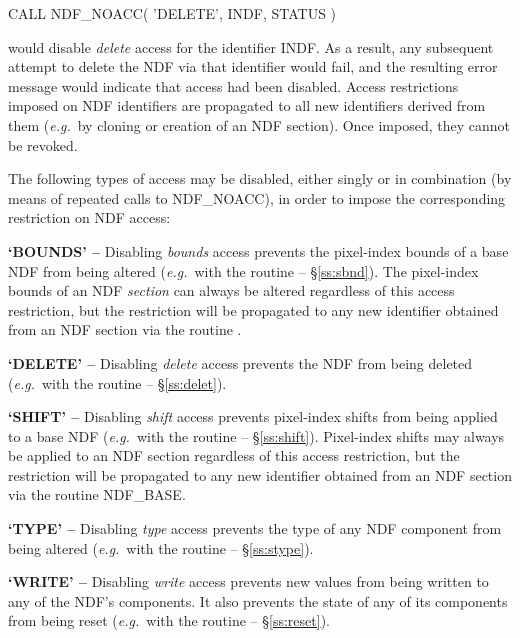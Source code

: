 \documentclass[twoside,11pt,nolof]{starlink}
\providecommand{\st}[1]{{\emph{#1}}}
\begin{document}
\small
\begin{terminalv}
      CALL NDF_NOACC( 'DELETE', INDF, STATUS )
\end{terminalv}
\normalsize

would disable \st{delete\/} access for the identifier INDF.
As a result, any subsequent attempt to delete the NDF via that identifier
would fail, and the resulting error message would indicate that access had
been disabled.
Access restrictions imposed on NDF identifiers are propagated to all new
identifiers derived from them (\st{e.g.}\ by cloning or creation of an NDF
section).
Once imposed, they cannot be revoked.

The following types of access may be disabled, either singly or in
combination (by means of repeated calls to NDF\_NOACC), in order to impose
the corresponding restriction on NDF access:

\begin{description}

\item\textbf{`BOUNDS' --} Disabling \st{bounds\/} access prevents the
pixel-index bounds of a base NDF from being altered (\st{e.g.}\ with the
routine  -- \S\ref{ss:sbnd}).
The pixel-index bounds of an NDF \st{section\/} can always be altered
regardless of this access restriction, but the restriction will be
propagated to any new identifier obtained from an NDF section via the
routine .

\item\textbf{`DELETE' --} Disabling \st{delete\/} access prevents the NDF from
being deleted (\st{e.g.}\ with the routine  -- \S\ref{ss:delet}).

\item\textbf{`SHIFT' --} Disabling \st{shift\/} access prevents pixel-index
shifts from being applied to a base NDF (\st{e.g.}\ with the routine
 -- \S\ref{ss:shift}).
Pixel-index shifts may always be applied to an NDF section regardless of
this access restriction, but the restriction will be propagated to any new
identifier obtained from an NDF section via the routine NDF\_BASE.

\item\textbf{`TYPE' --} Disabling \st{type\/} access prevents the type of any
NDF component from being altered (\st{e.g.}\ with the routine  --
\S\ref{ss:stype}).

\item\textbf{`WRITE' --} Disabling \st{write\/} access prevents new values from
being written to any of the NDF's components.
It also prevents the state of any of its components from being reset
(\st{e.g.}\ with the routine  --
\S\ref{ss:reset}).

\end{description}
\end{document}
